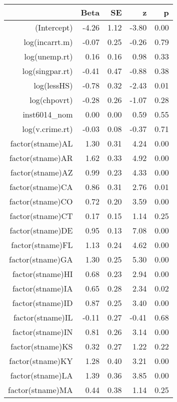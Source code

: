 \begin{table}[ht]
\centering
\begin{tabular}{rrrrr}
  \hline
 & Beta & SE & z & p \\ 
  \hline
(Intercept) & -4.26 & 1.12 & -3.80 & 0.00 \\ 
  log(incarrt.m) & -0.07 & 0.25 & -0.26 & 0.79 \\ 
  log(unemp.rt) & 0.16 & 0.16 & 0.98 & 0.33 \\ 
  log(singpar.rt) & -0.41 & 0.47 & -0.88 & 0.38 \\ 
  log(lessHS) & -0.78 & 0.32 & -2.43 & 0.01 \\ 
  log(chpovrt) & -0.28 & 0.26 & -1.07 & 0.28 \\ 
  inst6014\_nom & 0.00 & 0.00 & 0.59 & 0.55 \\ 
  log(v.crime.rt) & -0.03 & 0.08 & -0.37 & 0.71 \\ 
  factor(stname)AL & 1.30 & 0.31 & 4.24 & 0.00 \\ 
  factor(stname)AR & 1.62 & 0.33 & 4.92 & 0.00 \\ 
  factor(stname)AZ & 0.99 & 0.23 & 4.33 & 0.00 \\ 
  factor(stname)CA & 0.86 & 0.31 & 2.76 & 0.01 \\ 
  factor(stname)CO & 0.72 & 0.20 & 3.59 & 0.00 \\ 
  factor(stname)CT & 0.17 & 0.15 & 1.14 & 0.25 \\ 
  factor(stname)DE & 0.95 & 0.13 & 7.08 & 0.00 \\ 
  factor(stname)FL & 1.13 & 0.24 & 4.62 & 0.00 \\ 
  factor(stname)GA & 1.30 & 0.25 & 5.30 & 0.00 \\ 
  factor(stname)HI & 0.68 & 0.23 & 2.94 & 0.00 \\ 
  factor(stname)IA & 0.65 & 0.28 & 2.34 & 0.02 \\ 
  factor(stname)ID & 0.87 & 0.25 & 3.40 & 0.00 \\ 
  factor(stname)IL & -0.11 & 0.27 & -0.41 & 0.68 \\ 
  factor(stname)IN & 0.81 & 0.26 & 3.14 & 0.00 \\ 
  factor(stname)KS & 0.32 & 0.27 & 1.22 & 0.22 \\ 
  factor(stname)KY & 1.28 & 0.40 & 3.21 & 0.00 \\ 
  factor(stname)LA & 1.39 & 0.36 & 3.85 & 0.00 \\ 
  factor(stname)MA & 0.44 & 0.38 & 1.14 & 0.25 \\ 

\end{tabular}
\end{table}
